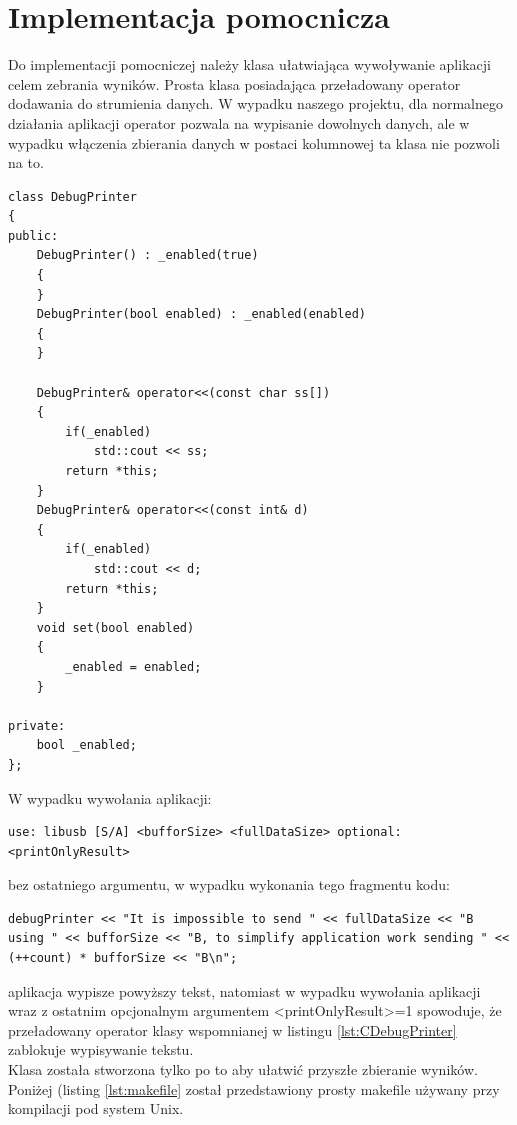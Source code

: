 \documentclass{BscUS}
\begin{document}
\section{Implementacja pomocnicza}

Do implementacji pomocniczej należy klasa ułatwiająca wywoływanie aplikacji celem zebrania wyników. Prosta klasa posiadająca przeładowany operator dodawania do strumienia danych. W wypadku naszego projektu, dla normalnego działania aplikacji operator pozwala na wypisanie dowolnych danych, ale w wypadku włączenia zbierania danych w postaci kolumnowej ta klasa nie pozwoli na to.

\begin{lstlisting}[caption={Klasa DebugPrinter},label={lst:CDebugPrinter}]
class DebugPrinter
{
public:
	DebugPrinter() : _enabled(true)
	{
	}
	DebugPrinter(bool enabled) : _enabled(enabled)
	{
	}
	
	DebugPrinter& operator<<(const char ss[])
	{
		if(_enabled)
			std::cout << ss;
		return *this;
	}
	DebugPrinter& operator<<(const int& d)
	{
		if(_enabled)
			std::cout << d;
		return *this;
	}
	void set(bool enabled)
	{
		_enabled = enabled;
	}

private:
	bool _enabled;
};
\end{lstlisting}
W wypadku wywołania aplikacji:
\begin{lstlisting}[caption={Uruchomienie testu}]
use: libusb [S/A] <bufforSize> <fullDataSize> optional:<printOnlyResult>
\end{lstlisting}
bez ostatniego argumentu, w wypadku wykonania tego fragmentu kodu: 
\begin{lstlisting}[caption={Wypisywanie w zależności od argumentu wywołania aplikacji}]
debugPrinter << "It is impossible to send " << fullDataSize << "B using " << bufforSize << "B, to simplify application work sending " << (++count) * bufforSize << "B\n";
\end{lstlisting}
aplikacja wypisze powyższy tekst, natomiast w wypadku wywołania aplikacji wraz z ostatnim opcjonalnym argumentem <printOnlyResult>=1 spowoduje, że przeładowany operator klasy wspomnianej w listingu \ref{lst:CDebugPrinter} zablokuje wypisywanie tekstu. \\
Klasa została stworzona tylko po to aby ułatwić przyszłe zbieranie wyników.
\newline
\newline
Poniżej (listing \ref{lst:makefile} został przedstawiony prosty makefile używany przy kompilacji pod system Unix.
\end{document}
